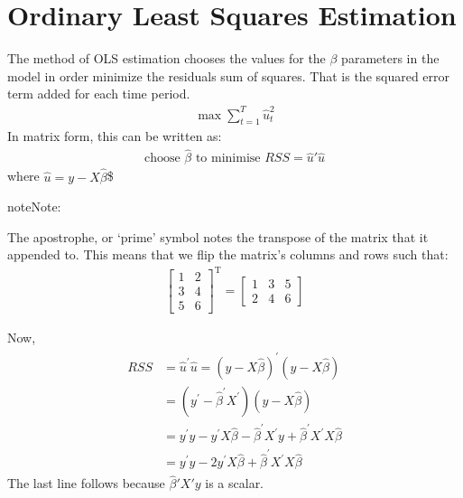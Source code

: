 \documentclass[letterpaper,10pt,english]{jupyterBook}
\begin{document}
\chapter{Ordinary Least Squares Estimation}
\label{\detokenize{parts/econometric-theory/linearmodels:ordinary-least-squares-estimation}}
The method of OLS estimation chooses the values for the \(\beta\) parameters in the model in order minimize the residuals sum of squares. That is the squared error term added for each time period.
\begin{equation*}
\begin{split} \max \sum_{t=1}^{T} \hat u_t^2 \end{split}
\end{equation*}
In matrix form, this can be written as:
\begin{equation*}
\begin{split} \text{choose } \hat \beta \text{ to minimise } RSS = \hat u'\hat u\end{split}
\end{equation*}
where \(\hat u = y - X \hat \beta\)\$

\begin{sphinxadmonition}{note}{Note:}

The apostrophe, or ‘prime’ symbol notes the transpose of the matrix that it appended to. This means that we flip the matrix’s columns and rows such that:
\begin{equation*}
\begin{split}\left[\begin{array}{ll}1 & 2 \\ 3 & 4 \\ 5 & 6\end{array}\right]^{\mathrm{T}}=\left[\begin{array}{lll}1 & 3 & 5 \\ 2 & 4 & 6\end{array}\right]\end{split}
\end{equation*}\end{sphinxadmonition}

Now,
\begin{equation*}
\begin{split}\begin{aligned} R S S &=\hat{u}^{\prime} \hat{u}=(y-X \hat{\beta})^{\prime}(y-X \hat{\beta}) \\ &=\left(y^{\prime}-\hat{\beta}^{\prime} X^{\prime}\right)(y-X \hat{\beta}) \\ &=y^{\prime} y-y^{\prime} X \hat{\beta}-\hat{\beta}^{\prime} X^{\prime} y+\hat{\beta}^{\prime} X^{\prime} X \hat{\beta} \\ &=y^{\prime} y-2 y^{\prime} X \hat{\beta}+\hat{\beta}^{\prime} X^{\prime} X \hat{\beta} \end{aligned}\end{split}
\end{equation*}
The last line follows because \(\hat \beta' X' y\) is a scalar.
\end{document}
